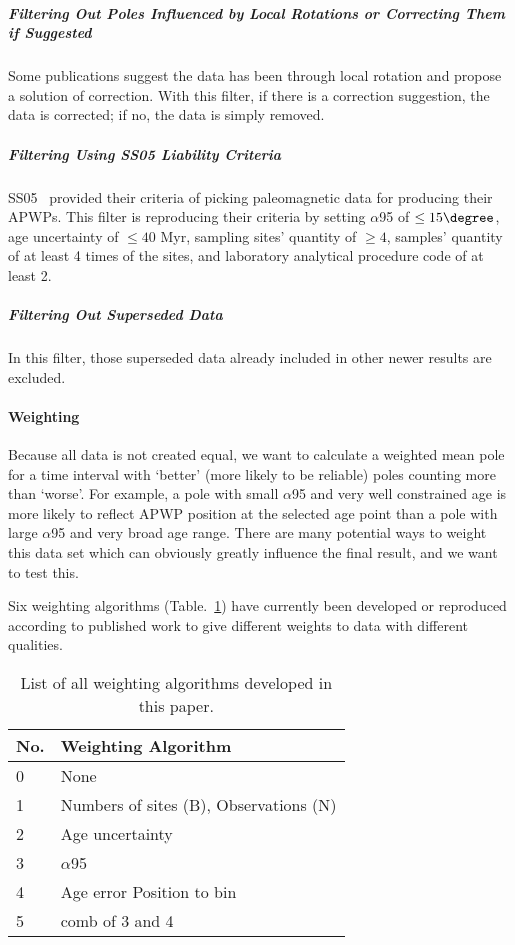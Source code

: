 \subparagraph{Filtering Out Poles Influenced by Local Rotations or Correcting
Them if Suggested}

Some publications suggest the data has been through local rotation and propose a
solution of correction. With this filter, if there is a correction suggestion,
the data is corrected; if no, the data is simply removed.

\subparagraph{Filtering Using SS05 Liability Criteria}

SS05~\cite{S05} provided their criteria of picking paleomagnetic data for
producing their APWPs. This filter is reproducing their criteria by setting
$\alpha$95 of $\leq15\degree$, age uncertainty of $\leq40$ Myr, sampling sites'
quantity of $\geq4$, samples' quantity of at least 4 times of the sites, and
laboratory analytical procedure code of at least 2.

\subparagraph{Filtering Out Superseded Data}

In this filter, those superseded data already included in other newer results
are excluded.

\paragraph{Weighting}

Because all data is not created equal, we want to calculate a weighted mean pole
for a time interval with `better' (more likely to be reliable) poles counting
more than `worse'. For example, a pole with small $\alpha$95 and very well
constrained age is more likely to reflect APWP position at the selected age
point than a pole with large $\alpha$95 and very broad age range. There are many
potential ways to weight this data set which can obviously greatly influence the
final result, and we want to test this.

Six weighting algorithms (Table.~\ref{tab-weit}) have currently been developed
or reproduced according to published work to give different weights to data with
different qualities.

\begin{table}
\centering
\caption{List of all weighting algorithms developed in this
         paper.}\label{tab-weit}
\begin{tabular}{@{}ll@{}}
\toprule
No. & Weighting Algorithm \\ \midrule
0 & None \\
1 & Numbers of sites (B), Observations (N) \\
2 & Age uncertainty \\
3 & $\alpha$95 \\
4 & Age error Position to bin \\
5 & comb of 3 and 4 \\ \bottomrule
\end{tabular}
\end{table}

